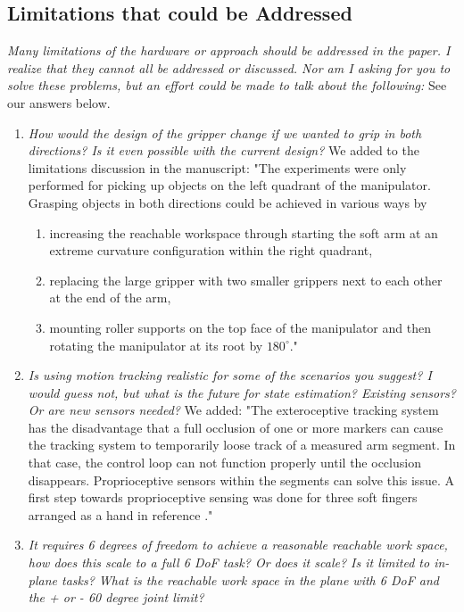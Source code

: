 \documentclass[letterpaper, 10 pt, twocolumn, conference]{article}
\begin{document}
\subsection{Limitations that could be Addressed}
\textit{Many limitations of the hardware or approach should be addressed in the paper. I realize that they cannot all be addressed or discussed. Nor am I asking for you to solve these problems, but an effort could be made to talk about the following:}
See our answers below.
%
\begin{enumerate}
\item \textit{How would the design of the gripper change if we wanted to grip in both directions? Is it even possible with the current design?}
%
We added to the limitations discussion in the manuscript:
"The experiments were only performed for picking up objects on the left quadrant of the manipulator. Grasping objects in both directions could be achieved in various ways by 
\begin{enumerate}
\item increasing the reachable workspace through starting the soft arm at an extreme curvature configuration within the right quadrant,
\item replacing the large gripper with two smaller grippers next to each other at the end of the arm, 
\item mounting roller supports on the top face of the manipulator and then rotating the manipulator at its root by $180^{\circ}$."  
\end{enumerate}
%
\item \textit{Is using motion tracking realistic for some of the scenarios you suggest? I would guess not, but what is the future for state estimation? Existing sensors? Or are new sensors needed?}
%
We added:
"The exteroceptive tracking system has the disadvantage that a full occlusion of one or more markers can cause the tracking system to temporarily loose track of a measured arm segment. In that case, the control loop can not function properly until the occlusion disappears. Proprioceptive sensors within the segments can solve this issue. A first step towards proprioceptive sensing was done for three soft fingers arranged as a hand in reference \cite{homberg2015haptic}."
%
\item \textit{It requires 6 degrees of freedom to achieve a reasonable reachable work space, how does this scale to a full 6 DoF task? Or does it scale? Is it limited to in-plane tasks? What is the reachable work space in the plane with 6 DoF and the + or - 60 degree joint limit?}

\end{enumerate}
\end{document}
